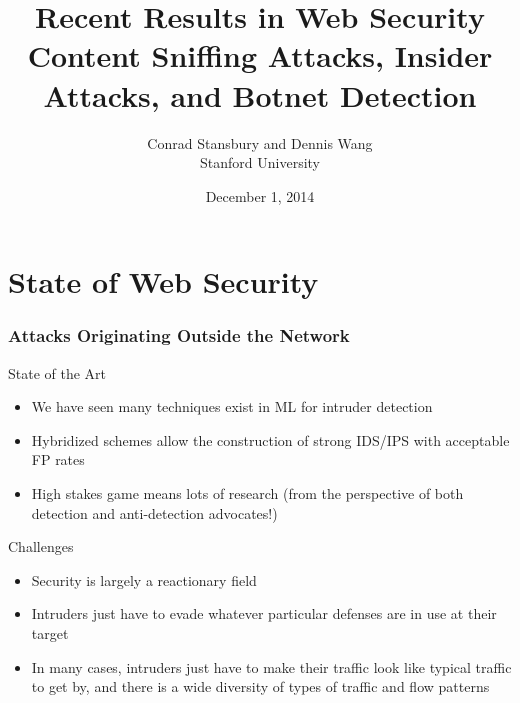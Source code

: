 \documentclass[10pt,mathserif]{beamer}
\title{\large \bfseries Recent Results in Web Security \\ Content
  Sniffing Attacks, Insider Attacks, and Botnet
  Detection}
\author{Conrad Stansbury and Dennis Wang\\[3ex]
  Stanford University}
\date{December 1, 2014}
\begin{document}
\frame{
  \thispagestyle{empty}
  \titlepage
}


\section{State of Web Security}

\begin{frame}
  \frametitle{Attacks Originating Outside the Network}
  \begin{block}{State of the Art}
    \begin{itemize}
    \item We have seen many techniques exist in ML for intruder
      detection
    \item Hybridized schemes allow the construction of strong IDS/IPS
      with acceptable FP rates
    \item High stakes game means lots of research (from the perspective
      of both detection and anti-detection advocates!)
    \end{itemize}
  \end{block}

  \begin{block}{Challenges}
    \begin{itemize}
    \item Security is largely a reactionary field
    \item Intruders just have to evade whatever particular defenses are
      in use at their target
    \item In many cases, intruders just have to make their traffic look
      like typical traffic to get by, and there is a wide diversity of
      types of traffic and flow patterns
    \end{itemize}
  \end{block}
\end{frame}
\end{document}

